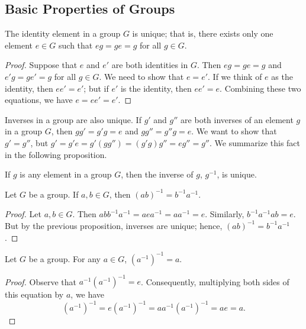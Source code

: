  
\subsection*{Basic Properties of Groups}
 
 
\begin{proposition}
The identity element in a group $G$ is unique; that is, there exists
only one element $e \in G$ such that $eg = ge = g$ for all $g \in G$. 
\end{proposition}
 
 
\begin{proof}
Suppose that $e$ and $e'$ are both identities in $G$. Then $eg = ge =
g$ and $e'g = ge' = g$ for all $g \in G$. We need to show that $e =
e'$. If we think of $e$ as the identity, then $ee' = e'$; but if $e'$
is the identity, then $ee' = e$. Combining these two equations, we
have $e = ee' = e'$. 
\end{proof}
 
 
\medskip
 
 
Inverses in a group are also unique. If $g'$ and $g''$ are both
inverses of an element $g$ in a group $G$, then $gg' = g'g = e$ and
$gg'' = g''g = e$. We want to show that $g' = g''$, but $g' = g'e =
g'(gg'') = (g'g)g'' = eg'' = g''$. We summarize this fact in the
following proposition. 
 
 
\begin{proposition}
If $g$ is any element in a group $G$, then the inverse of $g$,
$g^{-1}$, is unique. 
\end{proposition}
 
 
\begin{proposition}
Let $G$ be a group. If $a, b \in G$, then $(ab)^{-1} = b^{-1}a^{-1}$. 
\end{proposition}
 
 
\begin{proof}
Let $a, b \in G$. Then $abb^{-1}a^{-1} = aea^{-1} = aa^{-1} = e$.
Similarly, $b^{-1}a^{-1}ab = e$. But by the previous proposition,
inverses are unique; hence, $(ab)^{-1} = b^{- 1}a^{-1}$.
\end{proof}
 
 
\begin{proposition}
Let $G$ be a group.  For any $a \in G$, $(a^{-1})^{-1} = a$.
\end{proposition}
 
 
\begin{proof}
Observe that $a^{-1} (a^{-1})^{-1} = e$. Consequently, multiplying
both sides of this equation by $a$, we have 
$$
(a^{-1})^{-1} = e (a^{-1})^{-1} = a a^{-1} (a^{-1})^{-1} = ae = a.
$$
\end{proof}
 
